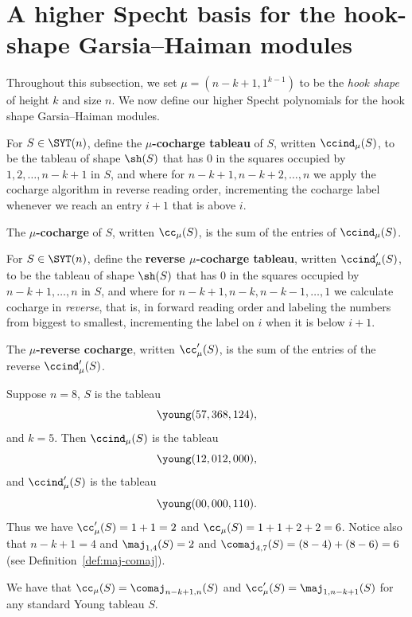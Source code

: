 \section{A higher Specht basis for the hook-shape Garsia--Haiman modules}\label{sec:hooks}

Throughout this subsection, we set $\mu=(n-k+1,1^{k-1})$ to be the \textit{hook shape} of height $k$ and size $n$.  We now define our higher Specht polynomials for the hook shape Garsia--Haiman modules.

\begin{definition}
	For $S\in \SYT(n)$, define the \textbf{$\mu$-cocharge tableau} of $S$, written $\ccind_\mu(S)$, to be the tableau of shape $\sh(S)$ that has $0$ in the squares occupied by $1,2,\ldots,n-k+1$ in $S$, and where for $n-k+1,n-k+2,\ldots,n$ we apply the cocharge algorithm in reverse reading order, incrementing the cocharge label whenever we reach an entry $i+1$ that is above $i$.
	
	The \textbf{$\mu$-cocharge} of $S$, written $\cc_\mu(S)$, is the sum of the entries of $\ccind_\mu(S)$.
\end{definition}

\begin{definition}
	For $S\in \SYT(n)$, define the \textbf{reverse $\mu$-cocharge tableau}, written $\ccind'_\mu(S)$, to be the tableau of shape $\sh(S)$ that has $0$ in the squares occupied by $n-k+1,\ldots,n$ in $S$, and where for $n-k+1,n-k,n-k-1,\ldots,1$ we calculate cocharge in \textit{reverse}, that is, in forward reading order and labeling the numbers from biggest to smallest, incrementing the label on $i$ when it is below $i+1$.
	
	The \textbf{$\mu$-reverse cocharge}, written $\cc'_\mu(S)$, is the sum of the entries of the reverse $\ccind'_\mu(S)$.
\end{definition}

\begin{example}\label{ex:cctab}
	Suppose $n=8$, $S$ is the tableau $$\young(57,368,124),$$ and $k=5$.  Then $\ccind_\mu(S)$ is the tableau $$\young(12,012,000),$$ and $\ccind'_\mu(S)$ is the tableau $$\young(00,000,110).$$ Thus we have $\cc_\mu'(S)=1+1=2$ and $\cc_\mu(S)=1+1+2+2=6$. Notice also that $n-k+1=4$ and $\maj_{1,4}(S)=2$ and $\comaj_{4,7}(S)=(8-4)+(8-6)=6$ (see Definition~\ref{def:maj-comaj}).
\end{example}

\begin{lemma}\label{lem:degrees}
	We have that $\cc_\mu(S)=\comaj_{n-k+1,n}(S)$ and $\cc_\mu'(S)=\maj_{1,n-k+1}(S)$ for any standard Young tableau $S$.
\end{lemma}

